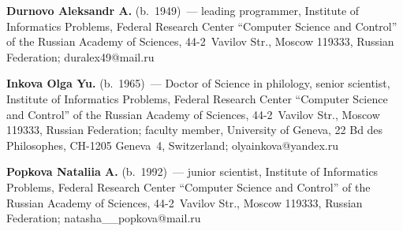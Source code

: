 \noindent
\textbf{Durnovo Aleksandr A.} (b.\ 1949)~--- leading programmer, Institute of 
Informatics Problems, Federal Research Center ``Computer Science and Control'' of the 
Russian Academy of Sciences, 44-2~Vavilov Str., Moscow 119333, Russian 
Federation; \mbox{duralex49@mail.ru}

\vspace*{1pt}

\noindent
\textbf{Inkova Olga Yu.} (b.\ 1965)~--- Doctor of Science in philology, senior scientist, 
Institute of Informatics Problems, Federal Research Center ``Computer Science and 
Control'' of the Russian Academy of Sciences, 44-2~Vavilov Str., Moscow 119333, 
Russian Federation; faculty member, University of Geneva, 22 Bd des Philosophes, 
CH-1205 Geneva~4, Switzerland; \mbox{olyainkova@yandex.ru}

\vspace*{1pt}

\noindent
\textbf{Popkova Nataliia A.} (b.\ 1992)~--- junior scientist, Institute of Informatics 
Problems, Federal Research Center ``Computer Science and Control'' of the Russian 
Academy of Sciences, 44-2~Vavilov Str., Moscow 119333, Russian Federation; 
\mbox{natasha\_\_popkova@mail.ru}



\label{end\stat}

\renewcommand{\bibname}{\protect\rm Литература}    